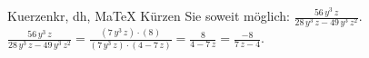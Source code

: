 \begin{MAufgabe}{Kuerzen}{kr, dh, MaTeX}
K\"urzen Sie soweit m\"oglich: $\frac{56\, y^3\, z}{28\, y^3\, z - 49\, y^3\, z^2}$.\\ 
\ifLsg\MLoesung
\quad $\frac{56\, y^3\, z}{28\, y^3\, z - 49\, y^3\, z^2}=\frac{(7\, y^3\, z)\cdot(8)}{(7\, y^3\, z)\cdot(4 - 7\, z)}=\frac{8}{4 - 7\, z}=\frac{-8}{7\, z - 4}$.\else\relax\fi
 \end{MAufgabe}